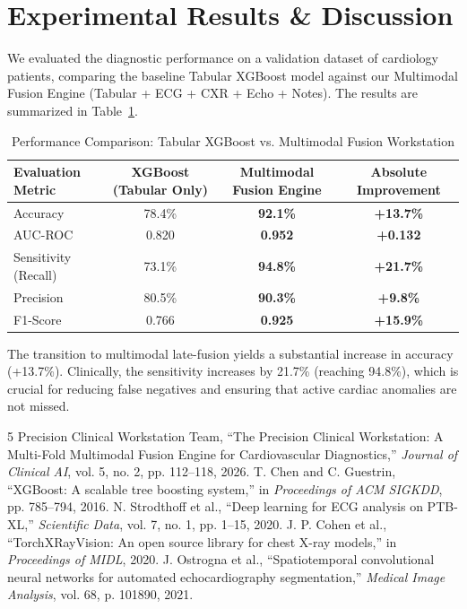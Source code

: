 \documentclass[10pt]{article}
\begin{document}
\section{Experimental Results \& Discussion}
We evaluated the diagnostic performance on a validation dataset of cardiology patients, comparing the baseline Tabular XGBoost model against our Multimodal Fusion Engine (Tabular + ECG + CXR + Echo + Notes). The results are summarized in Table~\ref{tab:metrics}.

\begin{table}[h]
\centering
\caption{Performance Comparison: Tabular XGBoost vs. Multimodal Fusion Workstation}
\label{tab:metrics}
\vspace{0.05in}
\begin{tabular}{lccc}
\toprule
\textbf{Evaluation Metric} & \textbf{XGBoost (Tabular Only)} & \textbf{Multimodal Fusion Engine} & \textbf{Absolute Improvement} \\
\midrule
Accuracy & 78.4\% & \textbf{92.1\%} & \textbf{+13.7\%} \\
AUC-ROC  & 0.820  & \textbf{0.952}  & \textbf{+0.132}  \\
Sensitivity (Recall) & 73.1\% & \textbf{94.8\%} & \textbf{+21.7\%} \\
Precision & 80.5\% & \textbf{90.3\%} & \textbf{+9.8\%}  \\
F1-Score  & 0.766  & \textbf{0.925}  & \textbf{+15.9\%} \\
\bottomrule
\end{tabular}
\end{table}

The transition to multimodal late-fusion yields a substantial increase in accuracy (+13.7\%). Clinically, the sensitivity increases by 21.7\% (reaching 94.8\%), which is crucial for reducing false negatives and ensuring that active cardiac anomalies are not missed.

\begin{thebibliography}{5}
 Precision Clinical Workstation Team, ``The Precision Clinical Workstation: A Multi-Fold Multimodal Fusion Engine for Cardiovascular Diagnostics,'' \textit{Journal of Clinical AI}, vol. 5, no. 2, pp. 112--118, 2026.
 T. Chen and C. Guestrin, ``XGBoost: A scalable tree boosting system,'' in \textit{Proceedings of ACM SIGKDD}, pp. 785--794, 2016.
 N. Strodthoff et al., ``Deep learning for ECG analysis on PTB-XL,'' \textit{Scientific Data}, vol. 7, no. 1, pp. 1--15, 2020.
 J. P. Cohen et al., ``TorchXRayVision: An open source library for chest X-ray models,'' in \textit{Proceedings of MIDL}, 2020.
 J. Ostrogna et al., ``Spatiotemporal convolutional neural networks for automated echocardiography segmentation,'' \textit{Medical Image Analysis}, vol. 68, p. 101890, 2021.
\end{thebibliography}
\end{document}
